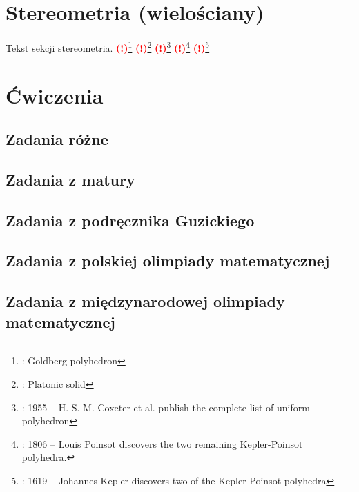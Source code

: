 \documentclass{greaseproof}
\newcommand{\todofoot}[1]{\textcolor{red}{\textbf{(!)}\footnote{\textbf{\color{red}{Do zrobienia}}: #1}}}
\begin{document}
\chapter{Stereometria (wielościany)}
Tekst sekcji stereometria.
\todofoot{Goldberg polyhedron} %
\todofoot{Platonic solid} %
\todofoot{1955 – H. S. M. Coxeter et al. publish the complete list of uniform polyhedron}
\todofoot{1806 – Louis Poinsot discovers the two remaining Kepler-Poinsot polyhedra.}
\todofoot{1619 – Johannes Kepler discovers two of the Kepler-Poinsot polyhedra}

\chapter{Ćwiczenia}
\section{Zadania różne}


\section{Zadania z matury}

\section{Zadania z podręcznika Guzickiego}

\section{Zadania z polskiej olimpiady matematycznej}

\section{Zadania z międzynarodowej olimpiady matematycznej}



{}


\raggedright
{}
\printindex

\printindex[persons]
\end{document}

